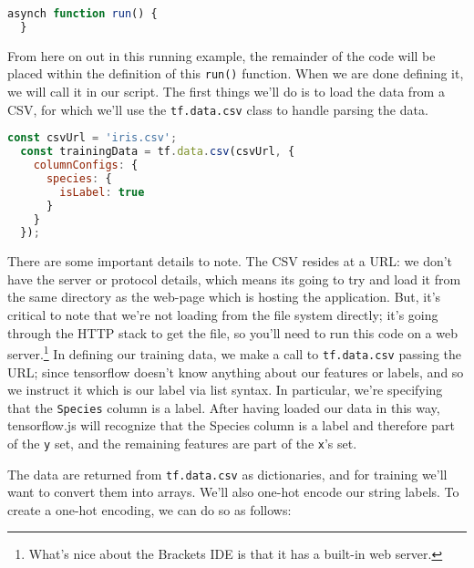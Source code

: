 \documentclass[12pt]{article}
\begin{document}
\begin{lstlisting}[language=JavaScript]
  asynch function run() { 
  }
\end{lstlisting}

From here on out in this running example, the remainder of the code will be placed within the definition of this \texttt{run()} function. When we are done defining it, we will call it in our script.
The first things we'll do is to load the data from a CSV, for which we'll use the \texttt{tf.data.csv} class to handle parsing the data.
\begin{lstlisting}[language=JavaScript]
  const csvUrl = 'iris.csv';
  const trainingData = tf.data.csv(csvUrl, {
    columnConfigs: {
      species: {
        isLabel: true
      }
    }
  });
\end{lstlisting}

There are some important details to note. The CSV resides at a URL: we don't have the server or protocol details, which means its going to try and load it from the same directory as the web-page which is hosting the application. But, it's critical to note that we're not loading from the file system directly; it's going through the HTTP stack to get the file, so you'll need to run this code on a web server.\footnote{What's nice about the Brackets IDE is that it has a built-in web server.} In defining our training data, we make a call to \texttt{tf.data.csv} passing the URL; since tensorflow doesn't know anything about our features or labels, and so we instruct it which is our label via list syntax. In particular, we're specifying that the \texttt{Species} column is a label. After having loaded our data in this way, tensorflow.js will recognize that the Species column is a label and therefore part of the \texttt{y} set, and the remaining features are part of the \texttt{x}'s set.

The data are returned from \texttt{tf.data.csv} as dictionaries, and for training we'll want to convert them into arrays. We'll also one-hot encode our string labels. To create a one-hot encoding, we can do so as follows:
\end{document}
